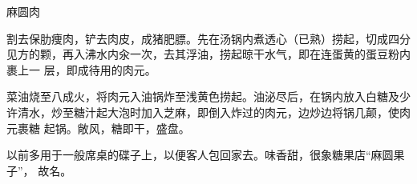 \begin{recipe}{麻圆肉}

\ingredients


\preparation

\step 割去保肋痩肉，铲去肉皮，成猪肥膘。先在汤锅内煮透心（已熟）捞起，切成四分
见方的颗，再入沸水内汆一次，去其浮油，捞起晾干水气，即在连蛋黄的蛋豆粉内裹上一
层，即成待用的肉元。

\step 菜油烧至八成火，将肉元入油锅炸至浅黄色捞起。油泌尽后，在锅内放入白糖及少
许清水，炒至糖汁起大泡时加入芝麻，即倒入炸过的肉元，边炒边将锅几颠，使肉元裹糖
起锅。敞风，糖即干，盛盘。

\features

以前多用于一般席桌的碟子上，以便客人包回家去。味香甜，很象糖果店“麻圆果子”，
故名。

\end{recipe}

